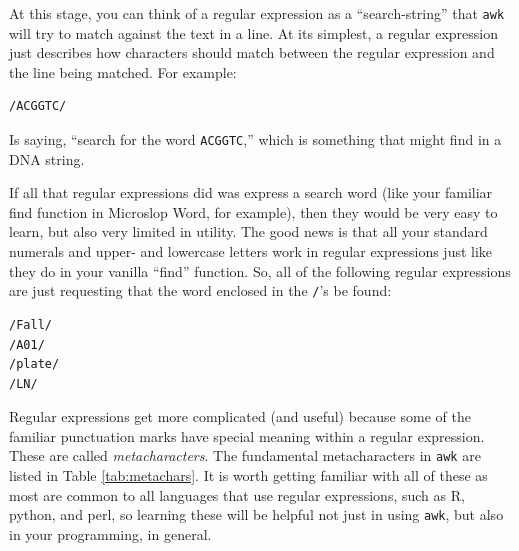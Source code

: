 \documentclass[]{krantz}
\begin{document}
At this stage, you can think of a regular expression as a ``search-string'' that \texttt{awk} will try to match
against the text in a line. At its simplest, a regular expression just describes how characters should
match between the regular expression and the line being matched. For example:

\begin{verbatim}
/ACGGTC/ 
\end{verbatim}

Is saying, ``search for the word \texttt{ACGGTC},'' which is something that might find in a DNA string.

If all that regular expressions did was express a search word (like your familiar find function in
Microslop Word, for example), then they would be very easy to learn, but also very limited in
utility. The good news is that all your standard numerals and upper- and lowercase letters work
in regular expressions just like they do in your vanilla ``find'' function. So, all of the following
regular expressions are just requesting that the word enclosed in the \texttt{/}'s be found:

\begin{verbatim}
/Fall/
/A01/
/plate/
/LN/
\end{verbatim}

Regular expressions get more complicated (and useful) because some of the familiar punctuation
marks have special meaning within a regular expression. These are called \emph{metacharacters}.
The fundamental metacharacters in \texttt{awk} are listed in Table \ref{tab:metachars}. It is
worth getting familiar with all of these as most are common to all languages that use
regular expressions, such as R, python, and perl, so learning these will be helpful not
just in using \texttt{awk}, but also in your programming, in general.
\end{document}

